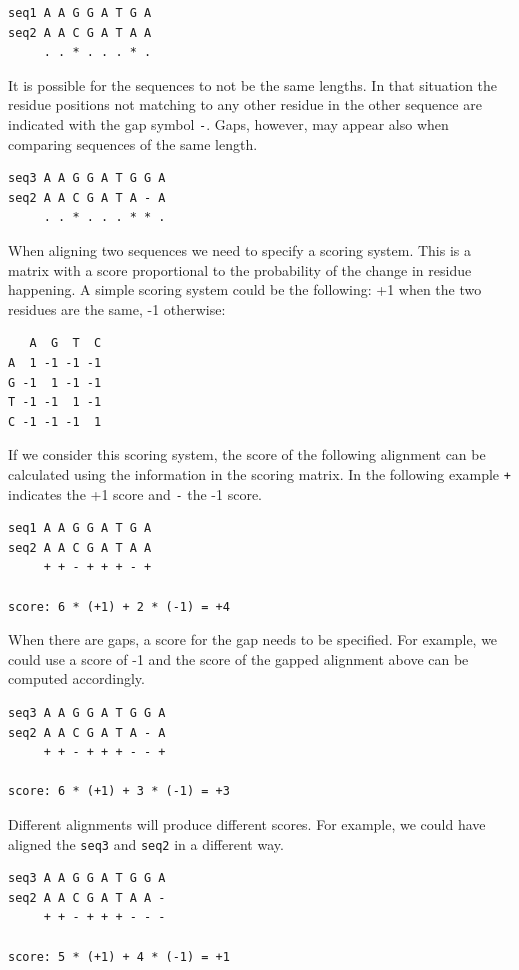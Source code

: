 \documentclass[]{book}
\theoremstyle{definition}
\theoremstyle{definition}
\theoremstyle{definition}
\theoremstyle{remark}
\begin{document}
\begin{verbatim}
seq1 A A G G A T G A
seq2 A A C G A T A A
     . . * . . . * .
\end{verbatim}

It is possible for the sequences to not be the same lengths. In that
situation the residue positions not matching to any other residue in the
other sequence are indicated with the gap symbol \texttt{-}. Gaps,
however, may appear also when comparing sequences of the same length.

\begin{verbatim}
seq3 A A G G A T G G A
seq2 A A C G A T A - A
     . . * . . . * * .
\end{verbatim}

When aligning two sequences we need to specify a scoring system. This is
a matrix with a score proportional to the probability of the change in
residue happening. A simple scoring system could be the following: +1
when the two residues are the same, -1 otherwise:

\begin{verbatim}
   A  G  T  C
A  1 -1 -1 -1
G -1  1 -1 -1
T -1 -1  1 -1
C -1 -1 -1  1
\end{verbatim}

If we consider this scoring system, the score of the following alignment
can be calculated using the information in the scoring matrix. In the
following example \texttt{+} indicates the +1 score and \texttt{-} the
-1 score.

\begin{verbatim}
seq1 A A G G A T G A 
seq2 A A C G A T A A
     + + - + + + - +

score: 6 * (+1) + 2 * (-1) = +4
\end{verbatim}

When there are gaps, a score for the gap needs to be specified. For
example, we could use a score of -1 and the score of the gapped
alignment above can be computed accordingly.

\begin{verbatim}
seq3 A A G G A T G G A
seq2 A A C G A T A - A
     + + - + + + - - +

score: 6 * (+1) + 3 * (-1) = +3
\end{verbatim}

Different alignments will produce different scores. For example, we
could have aligned the \texttt{seq3} and \texttt{seq2} in a different
way.

\begin{verbatim}
seq3 A A G G A T G G A
seq2 A A C G A T A A -
     + + - + + + - - -

score: 5 * (+1) + 4 * (-1) = +1
\end{verbatim}
\end{document}
